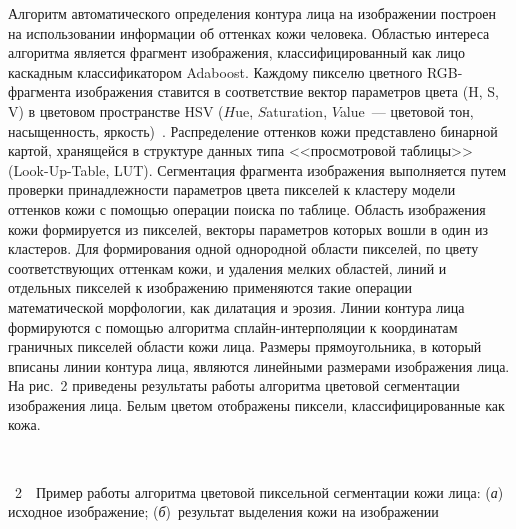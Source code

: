 \begin{multicols}{2}
Алгоритм автоматического определения контура лица на изображении построен на использовании информации об оттенках кожи 
человека.\linebreak
Об\-ластью интереса алгоритма является фрагмент изоб\-ра\-же\-ния, классифицированный как лицо каскадным 
классификатором Adaboost. Каждому пикселю цветного RGB-фрагмента изображения ставится в соответствие вектор параметров 
цвета (H, S, V) в цветовом пространстве HSV ($H$ue, $S$aturation, $V$alue~--- цветовой тон, насыщенность, яркость)~\cite{6kor}. 
Распределение оттенков кожи представлено бинарной картой, хранящейся в структуре данных типа <<просмотровой таблицы>> 
(Look-Up-Table, LUT). Сегментация фрагмента изображения выполняется путем проверки принадлежности параметров цвета 
пикселей к кластеру модели оттенков кожи с помощью операции поиска по таблице. Область изображения кожи формируется из 
пикселей, векторы параметров которых вошли в один из кластеров. Для формирования одной однородной области пикселей, по 
цвету соответствующих оттенкам кожи, и удаления мелких областей, линий и отдельных пикселей к изображению применяются 
такие операции математической морфологии, как дилатация и эрозия. Линии контура лица формируются с помощью алгоритма 
сплайн-интерполяции к координатам граничных пикселей области кожи лица. Размеры прямоугольника, в который вписаны 
линии контура лица, являются линейными размерами изображения лица. На рис.~2 приведены результаты работы 
алгоритма цветовой сегментации изображения лица. Белым цветом отображены пиксели, классифицированные как кожа.

\begin{center} %
\vspace*{4pt}
\mbox{%
\epsfxsize=78.293mm
}
\end{center}
\vspace*{2pt}
{{\figurename~2}\ \ \small{Пример работы алгоритма цветовой пиксельной сегментации кожи лица: (\textit{а})~
исходное изображение; (\textit{б})~результат выделения кожи на изображении}}


\bigskip
\addtocounter{figure}{1}



\end{multicols}
